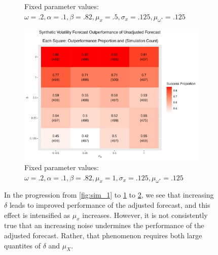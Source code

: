 \documentclass[11pt,3p,review,authoryear]{elsarticle}
\theoremstyle{definition}
\begin{document}
\begin{figure}[!h]
\begin{subfigure}{.44\linewidth}
        \caption{Fixed parameter values: $\omega = .2, \alpha = .1, \beta = .82, \mu_{x} = .5, \sigma_{x} = .125, \mu_{\omega^{*}} = .125$}\label{fig:sim_2}
    \end{subfigure}

    \begin{subfigure}{.44\linewidth} 
      \centering
        \includegraphics[scale=.42]{simulation_plots/Jun06_234111_2024_delta_sigma[u].png}
        \caption{Fixed parameter values: $\omega = .2, \alpha = .1, \beta = .82, \mu_{x} = 1, \sigma_{x} = .125, \mu_{\omega^{*}} = .125$}\label{fig:sim_3}
    \end{subfigure}
    
        \caption{In the progression from \ref{fig:sim_1} to \ref{fig:sim_2} to \ref{fig:sim_3}, we see that increasing $\delta$ leads to improved performance of the adjusted forecast, and this effect is intensified as $\mu_{x}$ increases.  However, it is not consistently true that an increasing noise undermines the performance of the adjusted forecast.  Rather, that phenomenon requires both large quantites of $\delta$ and $\mu_{X}$.}
        \label{fig:signoise}
      \end{figure}
\end{document}
